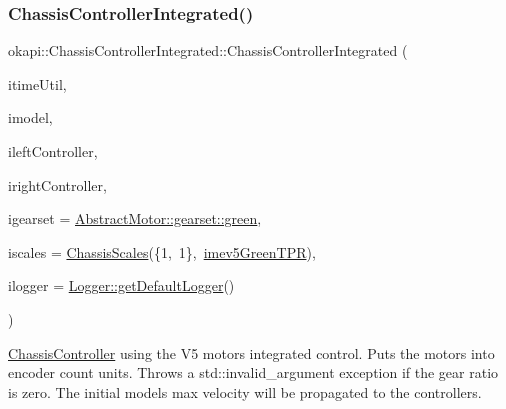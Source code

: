 \subsubsection{\texorpdfstring{ChassisControllerIntegrated()}{ChassisControllerIntegrated()}}
{\footnotesize\ttfamily okapi\+::\+Chassis\+Controller\+Integrated\+::\+Chassis\+Controller\+Integrated (\begin{DoxyParamCaption}\item[{const \mbox{\hyperlink{classokapi_1_1TimeUtil}{Time\+Util}} \&}]{itime\+Util,  }\item[{std\+::shared\+\_\+ptr$<$ \mbox{\hyperlink{classokapi_1_1ChassisModel}{Chassis\+Model}} $>$}]{imodel,  }\item[{std\+::unique\+\_\+ptr$<$ \mbox{\hyperlink{classokapi_1_1AsyncPosIntegratedController}{Async\+Pos\+Integrated\+Controller}} $>$}]{ileft\+Controller,  }\item[{std\+::unique\+\_\+ptr$<$ \mbox{\hyperlink{classokapi_1_1AsyncPosIntegratedController}{Async\+Pos\+Integrated\+Controller}} $>$}]{iright\+Controller,  }\item[{const \mbox{\hyperlink{structokapi_1_1AbstractMotor_1_1GearsetRatioPair}{Abstract\+Motor\+::\+Gearset\+Ratio\+Pair}} \&}]{igearset = {\ttfamily \mbox{\hyperlink{classokapi_1_1AbstractMotor_a88aaa6ea2fa10f5520a537bbf26774d5a9f27410725ab8cc8854a2769c7a516b8}{Abstract\+Motor\+::gearset\+::green}}},  }\item[{const \mbox{\hyperlink{classokapi_1_1ChassisScales}{Chassis\+Scales}} \&}]{iscales = {\ttfamily \mbox{\hyperlink{classokapi_1_1ChassisScales}{Chassis\+Scales}}(\{1,~1\},~\mbox{\hyperlink{namespaceokapi_a5263bab3bfecd482a573b6d04fb584ac}{imev5\+Green\+T\+PR}})},  }\item[{std\+::shared\+\_\+ptr$<$ \mbox{\hyperlink{classokapi_1_1Logger}{Logger}} $>$}]{ilogger = {\ttfamily \mbox{\hyperlink{classokapi_1_1Logger_a5053cf778b4b55acba788a3797dc96d2}{Logger\+::get\+Default\+Logger}}()} }\end{DoxyParamCaption})}

\mbox{\hyperlink{classokapi_1_1ChassisController}{Chassis\+Controller}} using the V5 motor\textquotesingle{}s integrated control. Puts the motors into encoder count units. Throws a {\ttfamily std\+::invalid\+\_\+argument} exception if the gear ratio is zero. The initial model\textquotesingle{}s max velocity will be propagated to the controllers.


